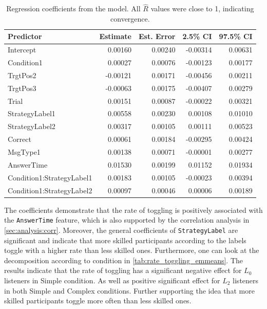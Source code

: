 \begin{table}[ht]
\centering
\caption{Regression coefficients from the model. All $\hat{R}$ values were close to 1, indicating convergence.}
\begin{tabular}{lrrrr}
\hline
\textbf{Predictor} & \textbf{Estimate} & \textbf{Est. Error} & \textbf{2.5\% CI} & \textbf{97.5\% CI} \\
\hline
Intercept                  & 0.00160 & 0.00240 & -0.00314 & 0.00631 \\
Condition1                 & 0.00027 & 0.00076 & -0.00123 & 0.00177 \\
TrgtPos2                   & -0.00121 & 0.00171 & -0.00456 & 0.00211 \\
TrgtPos3                   & -0.00063 & 0.00175 & -0.00407 & 0.00279 \\
Trial                      & 0.00151 & 0.00087 & -0.00022 & 0.00321 \\
StrategyLabel1             & 0.00558 & 0.00230 & 0.00108  & 0.01010 \\
StrategyLabel2             & 0.00317 & 0.00105 & 0.00111  & 0.00523 \\
Correct                    & 0.00061 & 0.00184 & -0.00295 & 0.00424 \\
MsgType1                   & 0.00138 & 0.00071 & -0.00001 & 0.00277 \\
AnswerTime                 & 0.01530 & 0.00199 & 0.01152  & 0.01934 \\
Condition1:StrategyLabel1  & 0.00183 & 0.00105 & -0.00023 & 0.00394 \\
Condition1:StrategyLabel2  & 0.00097 & 0.00046 & 0.00006  & 0.00189 \\
\hline
\end{tabular}
\label{tab:model_coefficients_rate_toggling}
\end{table}


The coefficients demonstrate that the rate of toggling is positively associated with the \texttt{AnswerTime} feature, which is also supported by the correlation analysis in \autoref{sec:analysis:corr}. Moreover, the general coefficients of \texttt{StrategyLabel} are significant and indicate that more skilled participants according to the labels toggle with a higher rate than less skilled ones. Furthermore, one can look at the decomposition according to condition in \autoref{tab:rate_toggling_emmeans}. The results indicate that the rate of toggling has a significant negative effect for $L_0$ listeners in Simple condition. As well as positive significant effect for $L_2$ listeners in both Simple and Complex conditions. Further supporting the idea that more skilled participants toggle more often than less skilled ones. 

